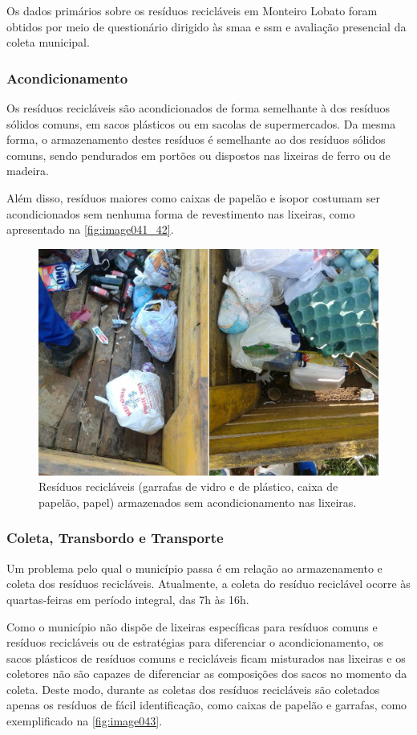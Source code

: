 Os dados primários sobre os resíduos recicláveis em Monteiro Lobato foram obtidos por meio de questionário dirigido às \gls{smaa} e \gls{ssm} e avaliação presencial da coleta municipal.

\subsubsection{Acondicionamento}

Os resíduos recicláveis são acondicionados de forma semelhante à dos resíduos sólidos comuns, em sacos plásticos ou em sacolas de supermercados. Da mesma forma, o armazenamento destes resíduos é semelhante ao dos resíduos sólidos comuns, sendo pendurados em portões ou dispostos nas lixeiras de ferro ou de madeira.

Além disso, resíduos maiores como caixas de papelão e isopor costumam ser acondicionados sem nenhuma forma de revestimento nas lixeiras, como apresentado na \autoref{fig:image041_42}.

\begin{figure}
	\centering
	\includegraphics[width=0.7\linewidth]{produtos/prodtres/image041_42}
	\caption{Resíduos recicláveis (garrafas de vidro e de plástico, caixa de papelão, papel) armazenados sem acondicionamento nas lixeiras.}
	\label{fig:image041_42}
\end{figure}

\subsubsection{Coleta, Transbordo e Transporte}

Um problema pelo qual o município passa é em relação ao armazenamento e coleta dos resíduos recicláveis. Atualmente, a coleta do resíduo reciclável ocorre às quartas-feiras em período integral, das 7h às 16h.

Como o município não dispõe de lixeiras específicas para resíduos comuns e resíduos recicláveis ou de estratégias para diferenciar o acondicionamento, os sacos plásticos de resíduos comuns e recicláveis ficam misturados nas lixeiras e os coletores não são capazes de diferenciar as composições dos sacos no momento da coleta. Deste modo, durante as coletas dos resíduos recicláveis são coletados apenas os resíduos de fácil identificação, como caixas de papelão e garrafas, como exemplificado na \autoref{fig:image043}.


